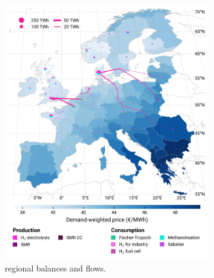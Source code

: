 \documentclass[final,5p,times,twocolumn,sort&compress]{elsarticle}
\begin{document}
\begin{figure}[htbp]
  \centering
  \begin{subfigure}[t]{0.49\textwidth}
      \vspace{0pt}
      \includegraphics[width=1\textwidth]{maps/greenfield-pipelines/base_s_adm___2030-balance_map_H2}
      \vspace{-0.5cm}
      \caption{ regional balances and flows.}
      \label{fig:CP_lt_2030_h2}
  \end{subfigure}
  \hfill
  \begin{subfigure}[t]{0.49\textwidth}
      \vspace{0pt}

\end{subfigure}
\end{figure}
\end{document}

